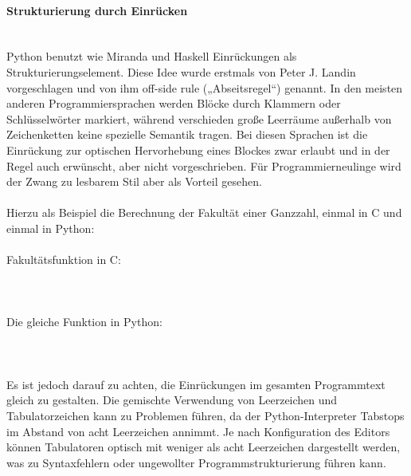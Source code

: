 \paragraph{Strukturierung durch Einrücken}\ \\
Python benutzt wie Miranda und Haskell Einrückungen als Strukturierungselement. Diese Idee wurde erstmals von Peter J. Landin vorgeschlagen und von ihm off-side rule („Abseitsregel“) genannt. In den meisten anderen Programmiersprachen werden Blöcke durch Klammern oder Schlüsselwörter markiert, während verschieden große Leerräume außerhalb von Zeichenketten keine spezielle Semantik tragen. Bei diesen Sprachen ist die Einrückung zur optischen Hervorhebung eines Blockes zwar erlaubt und in der Regel auch erwünscht, aber nicht vorgeschrieben. Für Programmierneulinge wird der Zwang zu lesbarem Stil aber als Vorteil gesehen.\\
\\
Hierzu als Beispiel die Berechnung der Fakultät einer Ganzzahl, einmal in C und einmal in Python:\\
\\
Fakultätsfunktion in C:\\
\\
\\
\\
Die gleiche Funktion in Python:\\
\\
\\
\\
Es ist jedoch darauf zu achten, die Einrückungen im gesamten Programmtext gleich zu gestalten. Die gemischte Verwendung von Leerzeichen und Tabulatorzeichen kann zu Problemen führen, da der Python-Interpreter Tabstops im Abstand von acht Leerzeichen annimmt. Je nach Konfiguration des Editors können Tabulatoren optisch mit weniger als acht Leerzeichen dargestellt werden, was zu Syntaxfehlern oder ungewollter Programmstrukturierung führen kann.\\
